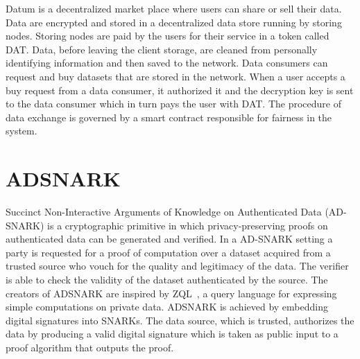 Datum is a decentralized market place where users can share or sell their data. Data are encrypted and stored in a decentralized data store running by storing nodes. Storing nodes are paid by the users for their service in a token called DAT. Data, before leaving the client storage, are cleaned from personally identifying information and then saved to the network. Data consumers can request and buy datasets that are stored in the network. When a user accepts a buy request from a data consumer, it authorized it and the decryption key is sent to the data consumer which in turn pays the user with DAT. The procedure of data exchange is governed by a smart contract responsible for fairness in the system.

\section{ADSNARK}
\label{rel_work:adsnark}

Succinct Non-Interactive Arguments of Knowledge on Authenticated Data (AD-SNARK) is a cryptographic primitive in which privacy-preserving proofs on authenticated data can be generated and verified. In a AD-SNARK setting a party is requested for a proof of computation over a dataset acquired from a trusted source who vouch for the quality and legitimacy of the data. The verifier is able to check the validity of the dataset authenticated by the source. The creators of ADSNARK are inspired by ZQL~\cite{zql}, a query language for expressing simple computations on private data. ADSNARK is achieved by embedding digital signatures into SNARKs. The data source, which is trusted, authorizes the data by producing a valid digital signature which is taken as public input to a proof algorithm that outputs the proof.
